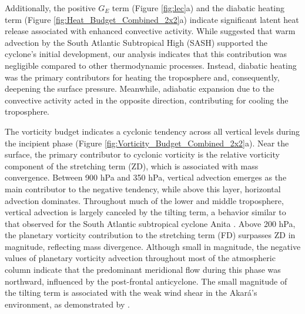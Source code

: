 \documentclass[pdflatex,sn-chicago]{sn-jnl}%
\theoremstyle{plain}
\theoremstyle{definition}
\theoremstyle{remark}
\theoremstyle{definition}
\begin{document}
Additionally, the positive $G_E$ term (Figure \ref{fig:lec}a) and the diabatic heating term (Figure \ref{fig:Heat_Budget_Combined_2x2}a) indicate significant latent heat release associated with enhanced convective activity. While \citet{reboita2024assessment} suggested that warm advection by the South Atlantic Subtropical High (SASH) supported the cyclone's initial development, our analysis indicates that this contribution was negligible compared to other thermodynamic processes. Instead, diabatic heating was the primary contributors for heating the troposphere and, consequently, deepening the surface pressure. Meanwhile, adiabatic expansion due to the convective activity acted in the opposite direction, contributing for cooling the troposphere.  

The vorticity budget indicates a cyclonic tendency across all vertical levels during the incipient phase (Figure \ref{fig:Vorticity_Budget_Combined_2x2}a). Near the surface, the primary contributor to cyclonic vorticity is the relative vorticity component of the stretching term (ZD), which is associated with mass convergence. Between 900 hPa and 350 hPa, vertical advection emerges as the main contributor to the negative tendency, while above this layer, horizontal advection dominates. Throughout much of the lower and middle troposphere, vertical advection is largely canceled by the tilting term, a behavior similar to that observed for the South Atlantic subtropical cyclone Anita \citep{dutra2017structure}. Above 200 hPa, the planetary vorticity contribution to the stretching term (FD) surpasses ZD in magnitude, reflecting mass divergence. Although small in magnitude, the negative values of planetary vorticity advection throughout most of the atmospheric column indicate that the predominant meridional flow during this phase was northward, influenced by the post-frontal anticyclone. The small magnitude of the tilting term is associated with the weak wind shear in the Akará's environment, as demonstrated by \citet{reboita2024assessment}.
\end{document}
